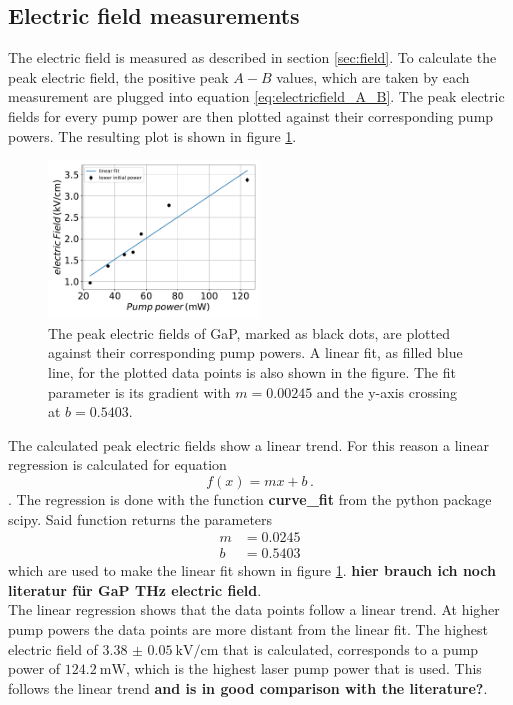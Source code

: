 \subsection{Electric field measurements}
\FloatBarrier
The electric field is measured as described in section \ref{sec:field}.
To calculate the peak electric field, the positive peak $A-B$ values, which are taken by each measurement are plugged into equation \eqref{eq:electricfield_A_B}.
The peak electric fields for every pump power are then plotted against their corresponding pump powers.
The resulting plot is shown in figure \ref{fig:gap_electricfield}.
\begin{figure}
    \centering
    \includegraphics[width=0.5\textwidth]{Plots/eltric_field_GaP.pdf}
    \caption{The peak electric fields of GaP, marked as black dots, are plotted against their corresponding pump powers.
    A linear fit, as filled blue line, for the plotted data points is also shown in the figure.
    The fit parameter is its gradient with $m=0.00245$ and the y-axis crossing at $b=0.5403$.}
    \label{fig:gap_electricfield}
\end{figure}
The calculated peak electric fields show a linear trend.
For this reason a linear regression is calculated for equation  
\begin{equation}
    f(x) = mx+b\,.
\end{equation}.
The regression is done with the function \textbf{curve\_fit} from the python package scipy.
Said function returns the parameters
\begin{align*} 
    m &= 0.0245\\
    b &= 0.5403
\end{align*}
which are used to make the linear fit shown in figure \ref{fig:gap_electricfield}.
\textbf{hier brauch ich noch literatur für GaP THz electric field}.
\\
The linear regression shows that the data points follow a linear trend.
At higher pump powers the data points are more distant from the linear fit.
The highest electric field of $\SI{3.38(5)}{\kilo\V\per\centi\meter}$ that is calculated, corresponds to a pump power of $\SI{124.2}{\milli\W}$, which is the highest laser pump power that is used.
This follows the linear trend \textbf{and is in good comparison with the literature?}.

